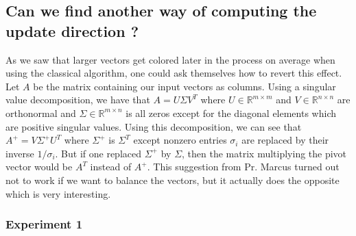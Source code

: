 \documentclass[12pt]{article}
\begin{document}
\subsection{Can we find another way of computing the update direction ?}
 As we saw that larger vectors get colored later in the process on average when using the classical algorithm, one could ask themselves how to revert this effect. Let $A$ be the matrix containing our input vectors as columns. Using a singular value decomposition, we have that $A=U\Sigma V^T$ where $U\in\mathbb{R}^{m\times m}$ and $V\in\mathbb{R}^{n\times n}$ are orthonormal and $\Sigma\in\mathbb{R}^{m\times n}$ is all zeros except for the diagonal elements which are positive singular values. Using this decomposition, we can see that $A^+=V\Sigma^+U^T$ where $\Sigma^+$ is $\Sigma^T$ except nonzero entries $\sigma_i$ are replaced by their inverse $1/\sigma_i$. But if one replaced $\Sigma^+$ by $\Sigma$, then the  matrix multiplying the pivot vector would be $A^T$ instead of $A^+$. This suggestion from Pr. Marcus turned out not to work if we want to balance the vectors, but it actually does the opposite which is very interesting. 

\subsubsection{Experiment 1}
\newpage


\newpage
\nocite{*}



\end{document}
